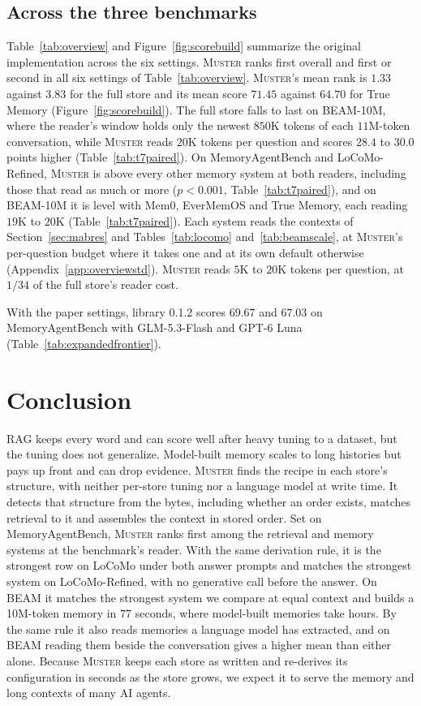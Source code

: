 \documentclass{article}
\newcommand{\sys}{\textsc{Muster}}
\begin{document}
\subsection{Across the three benchmarks}\label{sec:across}

Table~\ref{tab:overview} and Figure~\ref{fig:scorebuild} summarize the original implementation across the six settings. \sys{} ranks first overall and first or second in all six settings of Table~\ref{tab:overview}. \sys{}'s mean rank is $1.33$ against $3.83$ for the full store and its mean score $71.45$ against $64.70$ for True Memory (Figure~\ref{fig:scorebuild}). The full store falls to last on BEAM-10M, where the reader's window holds only the newest $850$K tokens of each $11$M-token conversation, while \sys{} reads $20$K tokens per question and scores $28.4$ to $30.0$ points higher (Table~\ref{tab:t7paired}). On MemoryAgentBench and LoCoMo-Refined, \sys{} is above every other memory system at both readers, including those that read as much or more ($p<0.001$, Table~\ref{tab:t7paired}), and on BEAM-10M it is level with Mem0, EverMemOS and True Memory, each reading $19$K to $20$K (Table~\ref{tab:t7paired}). Each system reads the contexts of Section~\ref{sec:mabres} and Tables~\ref{tab:locomo} and~\ref{tab:beamscale}, at \sys{}'s per-question budget where it takes one and at its own default otherwise (Appendix~\ref{app:overviewstd}). \sys{} reads $5$K to $20$K tokens per question, at $1/34$ of the full store's reader cost.

With the paper settings, library 0.1.2 scores $69.67$ and $67.03$ on MemoryAgentBench with GLM-5.3-Flash and GPT-6 Luna (Table~\ref{tab:expandedfrontier}).

\FloatBarrier
\section{Conclusion}

RAG keeps every word and can score well after heavy tuning to a dataset, but the tuning does not generalize. Model-built memory scales to long histories but pays up front and can drop evidence. \sys{} finds the recipe in each store's structure, with neither per-store tuning nor a language model at write time. It detects that structure from the bytes, including whether an order exists, matches retrieval to it and assembles the context in stored order. Set on MemoryAgentBench, \sys{} ranks first among the retrieval and memory systems at the benchmark's reader. With the same derivation rule, it is the strongest row on LoCoMo under both answer prompts and matches the strongest system on LoCoMo-Refined, with no generative call before the answer. On BEAM it matches the strongest system we compare at equal context and builds a 10M-token memory in $77$ seconds, where model-built memories take hours. By the same rule it also reads memories a language model has extracted, and on BEAM reading them beside the conversation gives a higher mean than either alone. Because \sys{} keeps each store as written and re-derives its configuration in seconds as the store grows, we expect it to serve the memory and long contexts of many AI agents.
\end{document}
